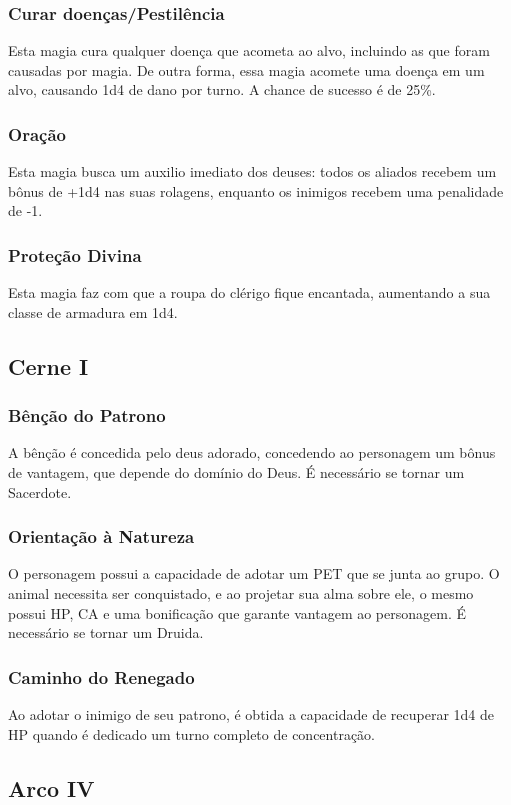 \documentclass[10pt,twoside,twocolumn]{book}
\begin{document}
\subsubsection*{Curar doenças/Pestilência}
Esta magia cura qualquer doença que acometa ao alvo, incluindo as que
foram causadas por magia. De outra forma, essa magia acomete uma doença em um alvo, causando 1d4 de dano por turno. A chance de sucesso é de 25\%.
\subsubsection*{Oração}
Esta magia busca um auxilio imediato dos deuses: todos os aliados recebem um bônus de +1d4 nas suas rolagens, enquanto os inimigos recebem uma penalidade de -1.
\subsubsection*{Proteção Divina}
Esta magia faz com que a roupa do clérigo fique encantada, aumentando a
sua classe de armadura em 1d4.

\subsection*{Cerne I}
\subsubsection*{Bênção do Patrono}
A bênção é concedida pelo deus adorado, concedendo ao personagem um bônus de vantagem, que depende do domínio do Deus. É necessário se tornar um Sacerdote. 
\subsubsection*{Orientação à Natureza}
O personagem possui a capacidade de adotar um PET que se junta ao grupo. O animal necessita ser conquistado, e ao projetar sua alma sobre ele, o mesmo possui HP, CA e uma bonificação que garante vantagem ao personagem. É necessário se tornar um Druida.
\subsubsection*{Caminho do Renegado}
Ao adotar o inimigo de seu patrono, é obtida a capacidade de recuperar 1d4 de HP quando é dedicado um turno completo de concentração.

\subsection*{Arco IV}
\end{document}
